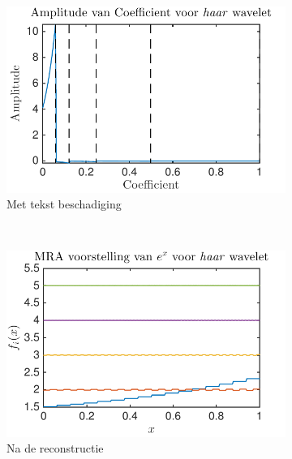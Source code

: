 \begin{figure}
    \centering
     \begin{subfigure}[b]{0.45\textwidth}
            \includegraphics[width=\textwidth]{../src/denoising/haar_noNoise/coef_exp_haar_4}
            \caption{Met tekst beschadiging}
            \label{fig:tiger}
        \end{subfigure}
        ~ %
        \begin{subfigure}[b]{0.45\textwidth}
            \includegraphics[width=\textwidth]{../src/denoising/haar_noNoise/MRA_exp_haar_4}
            \caption{Na de reconstructie}
            \label{fig:mouse}
        \end{subfigure}
    \begin{subfigure}[b]{0.45\textwidth}

\end{subfigure}
\end{figure}

